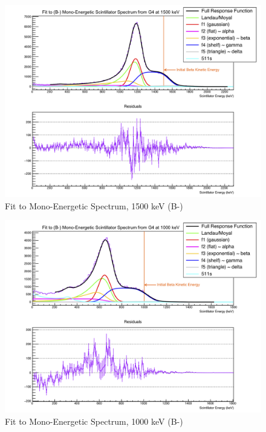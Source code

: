 \begin{figure}[h!!tb]
	\centering
	\includegraphics[width=.999\linewidth]
	{Figures/MonoFit_1500.png}
	\caption[Fit to Mono-Energetic Spectrum, 1500 keV]{Fit to Mono-Energetic Spectrum, 1500 keV (B-)}	
\end{figure}
\begin{figure}[h!!tb]
	\centering
	\includegraphics[width=.999\linewidth]
	{Figures/MonoFit_1000.png}
	\caption[Fit to Mono-Energetic Spectrum, 1000 keV]{Fit to Mono-Energetic Spectrum, 1000 keV (B-)}	
\end{figure}
